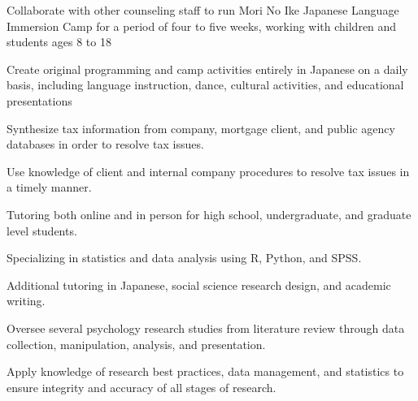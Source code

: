 \documentclass[letterpaper]{deedy-resume_sm} %
\begin{document}
\begin{tightitemize}
\item Collaborate with other counseling staff to run Mori No Ike Japanese Language Immersion Camp for a period of four to five weeks, working with children and students ages 8 to 18
\item Create original programming and camp activities entirely in Japanese on a daily basis, including language instruction, dance, cultural activities, and educational presentations
\end{tightitemize}
\begin{tightitemize}
\item Synthesize tax information from company, mortgage client, and public agency databases in order to resolve tax issues.
\item Use knowledge of client and internal company procedures to resolve tax issues in a timely manner.
\end{tightitemize}
\sectionspace %
\begin{tightitemize}
\item Tutoring both online and in person for high school, undergraduate, and graduate level students.
\item Specializing in statistics and data analysis using R, Python, and SPSS.
\item Additional tutoring in Japanese, social science research design, and academic writing.
\end{tightitemize}
\sectionspace %
\begin{tightitemize}
\item Oversee several psychology research studies from literature review through data collection, manipulation, analysis, and presentation. 
\item Apply knowledge of research best practices, data management, and statistics to ensure integrity and accuracy of all stages of research.
\end{tightitemize}
\end{document}
